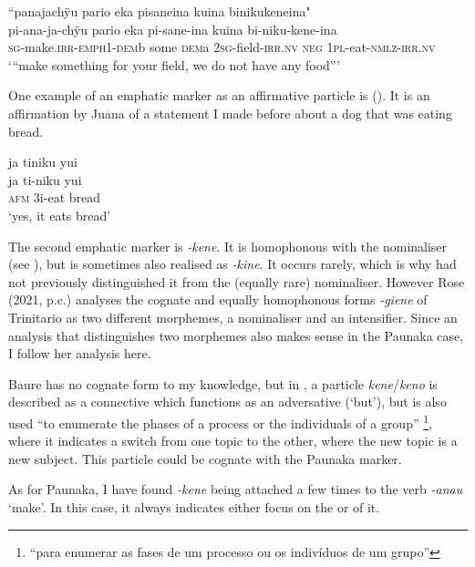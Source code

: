 \ea\label{ex:emphi-3}
\begingl
\glpreamble “panajachÿu pario eka pisaneina kuina binikukeneina"\\
\gla pi-ana-ja-chÿu pario eka pi-sane-ina kuina bi-niku-kene-ina\\
\textsc{sg}-make.\textsc{irr}-\textsc{emph}1-\textsc{dem}b some \textsc{dem}a 2\textsc{sg}-field-\textsc{irr.nv} \textsc{neg} 1\textsc{pl}-eat-\textsc{nmlz}-\textsc{irr.nv}\\
\glft ‘“make something for your field, we do not have any food”’
\endgl
\trailingcitation{[mox-n110920l.015]}
\xe

One example of an emphatic marker as an affirmative particle is (). It is an affirmation by Juana of a statement I made before about a dog that was eating bread.

\ea\label{ex:emphi-4}
\begingl
\glpreamble ja tiniku yui\\
\gla ja ti-niku yui\\
\glb \textsc{afm} 3i-eat bread\\
\glft ‘yes, it eats bread’
\endgl
\trailingcitation{[jxx-e110923l-2.042]}
\xe



The second emphatic marker is \textit{-kene}. It is homophonous with the nominaliser (see ), but is sometimes also realised as \textit{-kine}. It occurs rarely, which is why had not previously distinguished it from the (equally rare) nominaliser. However Rose (2021, p.c.) analyses the cognate and equally homophonous forms \textit{-giene} of Trinitario as two different morphemes, a nominaliser and an intensifier. Since an analysis that distinguishes two morphemes also makes sense in the Paunaka case, I follow her analysis here. 

Baure has no cognate form to my knowledge, but in , a particle \textit{kene}/\textit{keno} is described as a connective which functions as an adversative (‘but’), but is also used “to enumerate the phases of a process or the individuals of a group” \citep[77]{ButlerEkdahl2014}\footnote{“para enumerar as fases de um processo ou os indivíduos de um grupo”}, where it indicates a switch from one topic to the other, where the new topic is a new subject. This particle could be cognate with the Paunaka marker.

As for Paunaka, I have found \textit{-kene} being attached a few times to the verb \textit{-anau} ‘make’. In this case, it always indicates either focus on the  or  of it.

